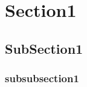 \documentclass[a4paper,10pt]{article}
\begin{document}



\tableofcontents
\newpage

\section{Section1}
\subsection{SubSection1}
\subsubsection{subsubsection1}
\end{document}
